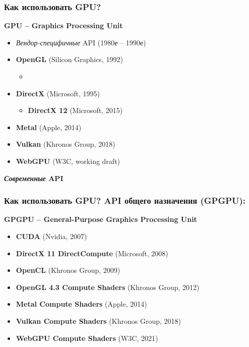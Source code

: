 \documentclass[10pt]{beamer}
\begin{document}
\begin{frame}
\frametitle{Как использовать GPU? }
\textbf{GPU -- Graphics Processing Unit}
\pause
\pause
\begin{itemize}
\item \textit{Вендор-специфичные} API (1980е -- 1990е)
\pause
\item \textbf{OpenGL} (Silicon Graphics, 1992)
\pause
\begin{itemize}
\item {}
\end{itemize}
\pause
\item \textbf{DirectX} (Microsoft, 1995)
\pause
\begin{itemize}
\item {\textbf{DirectX 12}} (Microsoft, 2015)
\end{itemize}
\pause
\item {\textbf{Metal}} (Apple, 2014)
\pause
\item {\textbf{Vulkan}} (Khronos Group, 2018)
\pause
\item {\textbf{WebGPU}} (W3C, working draft)
\end{itemize}
\pause
\bigskip
{\color{mLightGreen}\textbf{\textit{Современные} API}}
\end{frame}

\begin{frame}
\frametitle{Как использовать GPU? API общего назначения (GPGPU):}
\textbf{GPGPU -- General-Purpose Graphics Processing Unit}
\pause
\begin{itemize}
\item \textbf{CUDA} (Nvidia, 2007)
\pause
\item \textbf{DirectX 11 DirectCompute} (Microsoft, 2008)
\pause
\item \textbf{OpenCL} (Khronos Group, 2009)
\pause
\item \textbf{OpenGL 4.3 Compute Shaders} (Khronos Group, 2012)
\pause
\item \textbf{Metal Compute Shaders} (Apple, 2014)
\pause
\item \textbf{Vulkan Compute Shaders} (Khronos Group, 2018)
\pause
\item \textbf{WebGPU Compute Shaders} (W3C, 2021)
\end{itemize}
\end{frame}
\end{document}
